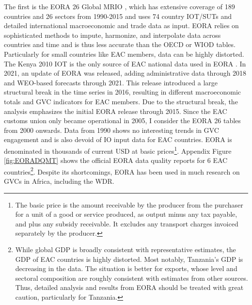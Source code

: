 \documentclass[a4paper]{article}
\begin{document}
The first is the EORA 26 Global MRIO \citep{lenzen2012mapping, lenzen2013building}, which has extensive coverage of 189 countries and 26 sectors from 1990-2015 and uses 74 country IOT/SUTs and detailed international macroeconomic and trade data as input. EORA relies on sophisticated methods to impute, harmonize, and interpolate data across countries and time and is thus less accurate than the OECD or WIOD tables. Particularly for small countries like EAC members, data can be highly distorted. The Kenya 2010 IOT is the only source of EAC national data used in EORA \citep{lenzen2013building}. In 2021, an update of EORA was released, adding administrative data through 2018 and WEO-based forecasts through 2021. This release introduced a large structural break in the time series in 2016, resulting in different macroeconomic totals and GVC indicators for EAC members. Due to the structural break, the analysis emphasizes the initial EORA release through 2015. Since the EAC customs union only became operational in 2005, I consider the EORA 26 tables from 2000 onwards. Data from 1990 shows no interesting trends in GVC engagement and is also devoid of IO input data for EAC countries. EORA is denominated in thousands of current USD at basic prices\footnote{The basic price is the amount receivable by the producer from the purchaser for a unit of a good or service produced, as output minus any tax payable, and plus any subsidy receivable. It excludes any transport charges invoiced separately by the producer.}. Appendix Figure \ref{fig:EORADQMT} shows the official EORA data quality reports for 6 EAC countries\footnote{While global GDP is broadly consistent with representative estimates, the GDP of EAC countries is highly distorted. Most notably, Tanzania's GDP is decreasing in the data. The situation is better for exports, whose level and sectoral composition are roughly consistent with estimates from other sources. Thus, detailed analysis and results from EORA should be treated with great caution, particularly for Tanzania.}. Despite its shortcomings, EORA has been used in much research on GVCs in Africa, including the WDR.\newline 
\end{document}
